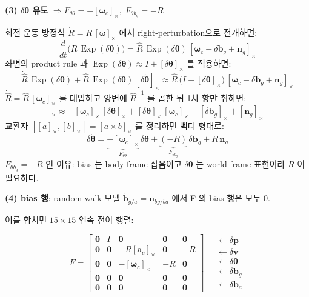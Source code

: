 \documentclass[11pt,a4paper,oneside]{report}
\newcommand{\skewop}[1]{[#1]_{\!\times}}
\DeclareMathOperator{\Exp}{Exp}
\begin{document}
\medskip
\noindent\textbf{(3) \(\dot{\delta\bm{\theta}}\) 유도} \hfill \(\Rightarrow F_{\theta\theta}=-\skewop{\bm{\omega}_c},\; F_{\theta b_g}=-R\)

회전 운동 방정식 \(\dot{R} = R\,\skewop{\bm{\omega}}\) 에서 right-perturbation으로 전개하면:
\begin{equation}
\frac{d}{dt}\bigl(\hat{R}\,\Exp(\delta\bm{\theta})\bigr)
  = \hat{R}\,\Exp(\delta\bm{\theta})\,\skewop{\bm{\omega}_c - \delta\bm{b}_g + \bm{n}_g}
\end{equation}
좌변의 product rule 과 \(\Exp(\delta\bm{\theta}) \approx I + \skewop{\delta\bm{\theta}}\) 를 적용하면:
\begin{equation}
\dot{\hat{R}}\,\Exp(\delta\bm{\theta}) + \hat{R}\,\Exp(\delta\bm{\theta})\,\skewop{\delta\dot{\bm{\theta}}}
\approx \hat{R}\,\bigl(I+\skewop{\delta\bm{\theta}}\bigr)\,\skewop{\bm{\omega}_c - \delta\bm{b}_g + \bm{n}_g}
\end{equation}
\(\dot{\hat{R}} = \hat{R}\,\skewop{\bm{\omega}_c}\) 를 대입하고 양변에 \(\hat{R}^{-1}\) 를 곱한 뒤 1차 항만 취하면:
\begin{equation}
\skewop{\delta\dot{\bm{\theta}}} \approx
  -\skewop{\bm{\omega}_c}\,\skewop{\delta\bm{\theta}}
  + \skewop{\delta\bm{\theta}}\,\skewop{\bm{\omega}_c}
  - \skewop{\delta\bm{b}_g} + \skewop{\bm{n}_g}
\end{equation}
교환자 \([\skewop{a},\skewop{b}] = \skewop{a \times b}\) 를 정리하면 벡터 형태로:
\begin{equation}
\delta\dot{\bm{\theta}} = \underbrace{-\skewop{\bm{\omega}_c}}_{F_{\theta\theta}}\,\delta\bm{\theta}
                        + \underbrace{(-R)}_{F_{\theta b_g}}\,\delta\bm{b}_g
                        + R\,\bm{n}_g
\end{equation}
\(F_{\theta b_g} = -R\) 인 이유: bias 는 body frame 잡음이고 \(\delta\bm{\theta}\) 는 world frame 표현이라 \(R\) 이 필요하다.

\medskip
\noindent\textbf{(4) bias 행}: random walk 모델 \(\dot{\bm{b}}_{g/a} = \bm{n}_{bg/ba}\) 에서 F 의 bias 행은 모두 0.

\medskip
이를 합치면 \(15{\times}15\) 연속 전이 행렬:

\begin{equation}
\boxed{
F = \begin{bmatrix}
\bm{0} & I & \bm{0} & \bm{0} & \bm{0} \\[3pt]
\bm{0} & \bm{0} & -R\skewop{\bm{a}_c} & \bm{0} & -R \\[3pt]
\bm{0} & \bm{0} & -\skewop{\bm{\omega}_c} & -R & \bm{0} \\[3pt]
\bm{0} & \bm{0} & \bm{0} & \bm{0} & \bm{0} \\[3pt]
\bm{0} & \bm{0} & \bm{0} & \bm{0} & \bm{0}
\end{bmatrix}
}
\quad
\begin{array}{l}
\leftarrow \delta\bm{p} \\
\leftarrow \delta\bm{v} \\
\leftarrow \delta\bm{\theta} \\
\leftarrow \delta\bm{b}_g \\
\leftarrow \delta\bm{b}_a
\end{array}
\end{equation}
\end{document}

